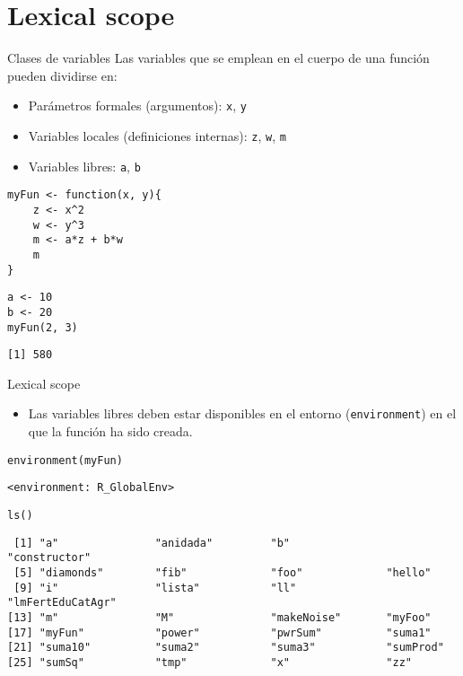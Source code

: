 \documentclass[xcolor={usenames,svgnames,dvipsnames}]{beamer}
\begin{document}
\section{Lexical scope}
\label{sec:org42b3ed7}

\begin{frame}[label={sec:org4231f06},fragile]{Clases de variables}
 Las variables que se emplean en el cuerpo de una función pueden
dividirse en:
\begin{itemize}
\item Parámetros formales (argumentos): \texttt{x}, \texttt{y}
\item Variables locales (definiciones internas): \texttt{z}, \texttt{w}, \texttt{m}
\item Variables libres: \texttt{a}, \texttt{b}
\end{itemize}
\lstset{language=r,label= ,caption= ,captionpos=b,numbers=none}
\begin{lstlisting}
myFun <- function(x, y){
    z <- x^2
    w <- y^3
    m <- a*z + b*w
    m
}
\end{lstlisting}

\lstset{language=r,label= ,caption= ,captionpos=b,numbers=none}
\begin{lstlisting}
a <- 10
b <- 20
myFun(2, 3)
\end{lstlisting}

\begin{verbatim}
[1] 580
\end{verbatim}
\end{frame}

\begin{frame}[label={sec:orgb43f2f9},fragile]{Lexical scope}
 \begin{itemize}
\item Las variables libres deben estar disponibles en el entorno
(\texttt{environment}) en el que la función ha sido creada.
\end{itemize}
\lstset{language=r,label= ,caption= ,captionpos=b,numbers=none}
\begin{lstlisting}
environment(myFun) 
\end{lstlisting}

\begin{verbatim}
<environment: R_GlobalEnv>
\end{verbatim}


\lstset{language=r,label= ,caption= ,captionpos=b,numbers=none}
\begin{lstlisting}
ls()
\end{lstlisting}

\begin{verbatim}
 [1] "a"               "anidada"         "b"               "constructor"    
 [5] "diamonds"        "fib"             "foo"             "hello"          
 [9] "i"               "lista"           "ll"              "lmFertEduCatAgr"
[13] "m"               "M"               "makeNoise"       "myFoo"          
[17] "myFun"           "power"           "pwrSum"          "suma1"          
[21] "suma10"          "suma2"           "suma3"           "sumProd"        
[25] "sumSq"           "tmp"             "x"               "zz"
\end{verbatim}
\end{frame}
\end{document}
